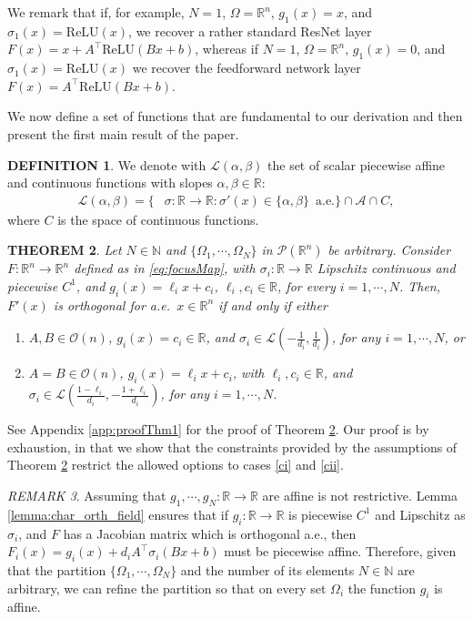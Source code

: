 \documentclass{article}
\newcommand{\R}{\mathbb{R}}
\theoremstyle{plain}
\newtheorem{theorem}{THEOREM}[section]
\theoremstyle{definition}
\newtheorem{definition}[theorem]{DEFINITION}
\theoremstyle{definition}
\theoremstyle{remark}
\newtheorem{remark}[theorem]{REMARK}
\theoremstyle{definition}
\theoremstyle{definition}
\theoremstyle{remark}
\numberwithin{equation}{section}
\begin{document}
We remark that if, for example, $N=1$, $\Omega=\mathbb{R}^n$, $g_1(x)=x$, 
and $\sigma_1(x)=\mathrm{ReLU}(x)$, we recover a rather standard ResNet layer $F(x)=x+A^\top \mathrm{ReLU}(Bx+b)$, whereas if $N=1$, $\Omega=\mathbb{R}^n$, $g_1(x)=0$, and $\sigma_1(x)=\mathrm{ReLU}(x)$ we recover the feedforward network layer $F(x)=A^\top \mathrm{ReLU}(Bx+b)$.

We now define a set of functions that are fundamental to our derivation and then present the first main result of the paper.

\begin{definition}
We denote with $\mathcal{L}(\alpha,\beta)$ the set of scalar piecewise affine and continuous functions with slopes $\alpha,\beta\in\mathbb{R}$:
\[
\begin{split}
\mathcal{L}(\alpha,\beta) = \{&\sigma:\mathbb{R}\to\mathbb{R}:\sigma'(x)\in\{\alpha,\beta\}\,\text{ a.e.}\}\cap\mathscr{A}\cap C,
\end{split}
\]
where $C$ is the space of continuous functions.
\end{definition}
\begin{theorem}\label{thm:char_RtoR_fields}
Let $N\in\mathbb{N}$ and $\{\Omega_1,\cdots,\Omega_N\}$ in $\mathcal{P}(\mathbb{R}^n)$ be arbitrary. Consider $F:\R^n\to\R^n$ defined as in \eqref{eq:focusMap}, with $\sigma_i:\mathbb{R}\to\mathbb{R}$ Lipschitz continuous and piecewise $C^1$, and $g_i(x)=\ell_ix+c_i$, $\ell_i,c_i\in\mathbb{R}$, for every $i=1,\cdots,N$. Then, $F'(x)$ is orthogonal for a.e.\, $x\in\mathbb{R}^n$ if and only if either
\begin{enumerate}
    \item\label{ci} $A,B\in\mathcal{O}(n)$, $g_i(x)=c_i\in\mathbb{R}$, and $\sigma_i\in\mathcal{L}\left(-\frac{1}{d_i},\frac{1}{d_i}\right)$, for any $i=1,\cdots,N$, or 
    \item\label{cii}$A=B\in\mathcal{O}(n)$, $g_i(x)=\ell_i x+ c_i$, with $\ell_i,c_i\in\mathbb{R}$, and $\sigma_i\in\mathcal{L}\left(\frac{1-\ell_i}{d_i},-\frac{1+\ell_i}{d_i}\right)$, for any $i=1,\cdots,N$.
\end{enumerate}
\end{theorem}
See Appendix \ref{app:proofThm1} for the proof of Theorem \ref{thm:char_RtoR_fields}. Our proof is by exhaustion, in that we show that the constraints provided by the assumptions of Theorem \ref{thm:char_RtoR_fields} restrict the allowed options to cases \ref{ci} and \ref{cii}.
\begin{remark}
Assuming that $g_1,\cdots,g_N:\R\to\R$ are affine is not restrictive. Lemma \ref{lemma:char_orth_field} ensures that if $g_i:\mathbb{R}\to\mathbb{R}$ is piecewise $C^1$ and Lipschitz as $\sigma_i$, and $F$ has a Jacobian matrix which is orthogonal a.e., then $F_i(x)=g_i(x)+d_iA^\top \sigma_i(Bx+b)$ must be piecewise affine. Therefore, given that the partition $\{\Omega_1,\cdots,\Omega_N\}$ and the number of its elements $N\in\mathbb{N}$ are arbitrary, we can refine the partition so that on every set $\Omega_i$ the function $g_i$ is affine.
\end{remark}
\end{document}
